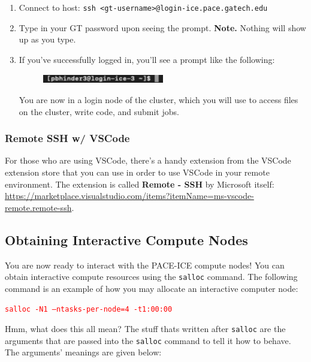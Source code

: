 \documentclass{article}
\begin{document}
\begin{enumerate}
    \item Connect to host: \texttt{ssh <gt-username>@login-ice.pace.gatech.edu}
    \item Type in your GT password upon seeing the prompt. \textbf{Note.} Nothing will show up as you type.
    \item If you've successfully logged in, you'll see a prompt like the following:
    \begin{figure}[H]
        \centering
        \includegraphics[width=0.5\textwidth]{img/Screenshot 2025-09-07 at 22.55.10.png}
    \end{figure}
    You are now in a login node of the cluster, which you will use to access files on the cluster, write code, and submit jobs. 
\end{enumerate}

\subsubsection{Remote SSH w/ VSCode}

For those who are using VSCode, there's a handy extension from the VSCode extension store that you can use in order to use VSCode in your remote environment. The extension is called \textbf{Remote - SSH} by Microsoft itself: \url{https://marketplace.visualstudio.com/items?itemName=ms-vscode-remote.remote-ssh}. 

\subsection{Obtaining Interactive Compute Nodes}

You are now ready to interact with the PACE-ICE compute nodes! You can obtain interactive compute resources using the \texttt{salloc} command. The following command is an example of how you may allocate an interactive computer node:

\begin{center}
    \textcolor{red}{\texttt{salloc -N1 --ntasks-per-node=4 -t1:00:00}}
\end{center}

\noindent Hmm, what does this all mean? The stuff thats written after \texttt{salloc} are the arguments that are passed into the \texttt{salloc} command to tell it how to behave. The arguments' meanings are given below:
\end{document}
